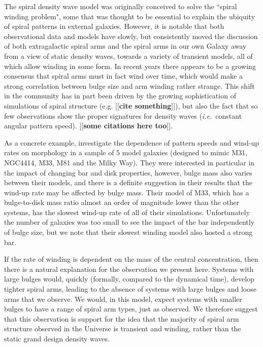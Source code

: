 \documentclass[usenatbib]{mn2e}
\newcommand{\ie}{{\it i.e.}}
\newcommand{\comment}[2][todo]{{\color{#1}[[{\bf #2}]]}}
\begin{document}
The spiral density wave model \citep{LinShu1964} was originally conceived to solve the ``spiral winding problem", some that was thought to be essential to explain the ubiquity of spiral patterns in external galaxies. However, it is notable that both observational data and models have slowly, but consistently moved the discussion of both extragalactic spiral arms \citep{2013ApJ...766...34D} and the spiral arms in our own Galaxy \citep{hunt2018} away from a view of static density waves, towards a variety of transient models, all of which allow winding in some form. In recent years there appears to be a growing consensus that spiral arms must in fact wind over time, which would make a strong correlation between bulge size and arm winding rather strange. This shift in the community has in part been driven by the growing sophistication of simulations of spiral structure (e.g. \comment{cite something}), but also the fact that so few observations show the proper signatures for density waves (\ie ~constant angular pattern speed). \comment{some citations here too}. 

  As a concrete example, \citet{PettittWadsley2018} investigate the dependence of pattern speeds and wind-up rates on morphology in a sample of 5 model galaxies (designed to mimic M31, NGC4414, M33, M81 and the Milky Way). They were interested in particular in the impact of changing bar and disk properties, however, bulge mass also varies between their models, and there is a definite suggestion in their results that the wind-up rate may be affected by bulge mass. Their model of M33, which has a bulge-to-disk mass ratio almost an order of magnitude lower than the other systems, has the slowest wind-up rate of all of their simulations. Unfortunately the number of galaxies was too small to see the impact of the bar independently of bulge size, but we note that their slowest winding model also hosted a strong bar.

If the rate of winding is dependent on the mass of the central concentration, then there is a natural explanation for the observation we present here. Systems with large bulges would, quickly (formally, compared to the dynamical time), develop tighter spiral arms, leading to the absence of systems with large bulges and loose arms that we observe. We would, in this model, expect systems with smaller bulges to have a range of spiral arm types, just as observed. We therefore suggest that this observation is support for the idea that the majority of spiral arm structure observed in the Universe is transient and winding, rather than the static grand design density waves. 
\end{document}
